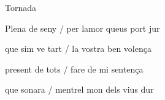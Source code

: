 \documentclass[12pt]{article}
\begin{document}
\begin{estrofaExtra}%




\begin{tornada}

Tornada

\end{tornada}


\end{estrofaExtra}


\begin{estrofa}

 Plena de seny / per lamor queus port jur

 que sim ve tart / la vostra ben volen\c{c}a

 present de tots / fare de mi senten\c{c}a

 que sonara / mentrel mon dels vius dur

\end{estrofa}
\end{document}
